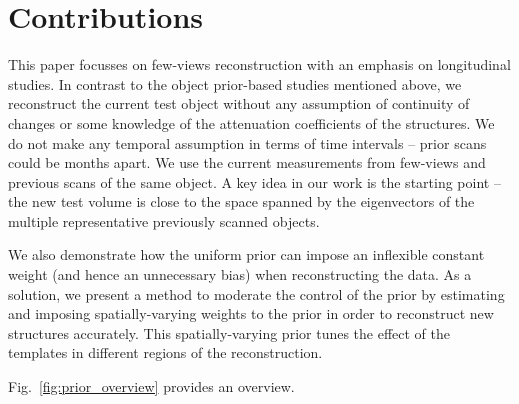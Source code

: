\documentclass[journal]{IEEEtran}
\begin{document}
\section{Contributions}
\label{sec:contributions}
This paper focusses on few-views reconstruction with an emphasis on
longitudinal studies. In contrast to
the object prior-based studies mentioned above, we
reconstruct the current test object without any assumption of
continuity of changes or some knowledge of the attenuation
coefficients of the structures. We do not make any temporal assumption
in terms of time intervals -- prior scans could be months apart. We
use the current measurements from few-views and previous scans of the
same object. A key idea in our work is the starting point -- the new
test volume is close to the space spanned by the eigenvectors of the
multiple representative previously scanned objects.


We also demonstrate how the uniform prior can impose an inflexible
constant weight (and hence an unnecessary bias) when reconstructing
the data. As a solution, we present a method to moderate the control
of the prior by estimating and imposing spatially-varying weights to
the prior in order to reconstruct new structures accurately. This
spatially-varying prior tunes the effect of the templates in different
regions of the reconstruction.

Fig.~\ref{fig:prior_overview} provides an overview.

\end{document}
